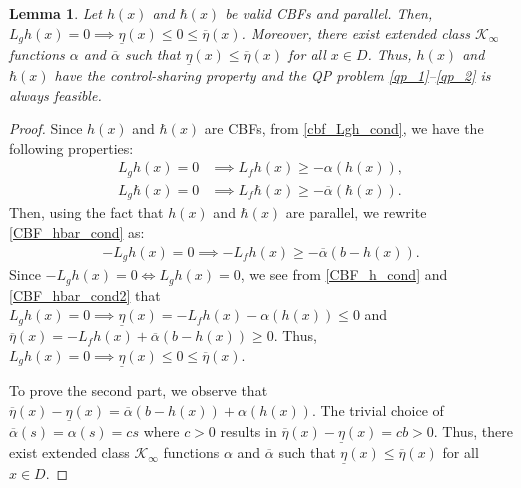 \documentclass[10pt,a4paper]{amsart}
\newtheorem{lemma}{Lemma}
\newcommand{\TODO}[1]{{\color{black}#1}}
\begin{document}
\begin{lemma}\label{lemma_feasible}
    Let $h(x)$ and $\hbar(x)$ be valid CBFs and parallel. Then, ${L_g h(x) = 0 \implies \underline{\eta}(x) \leq 0 \leq \overline{\eta}(x)}$. Moreover, there exist extended class $\mathcal{K}_{\infty}$ functions $\alpha$ and $\overline{\alpha}$ such that $\underline{\eta}(x) \leq \overline{\eta}(x)$ for all $x \in D$. Thus, $h(x)$ and $\hbar(x)$ have the control-sharing property and the QP problem \eqref{qp_1}--\eqref{qp_2} is always feasible.
\end{lemma}

\begin{proof}
    Since \TODO{$h(x)$ and $\hbar(x)$} 
    are CBFs, from \eqref{cbf_Lgh_cond}, we have the following properties:
    \begin{align}
            L_gh(x) = 0 &\implies L_fh(x) \geq -\alpha(h(x)),\label{CBF_h_cond}\\ 
            L_g\hbar(x) = 0 &\implies L_f\hbar(x) \geq -\overline{\alpha}(\hbar(x)).\label{CBF_hbar_cond}
    \end{align}
    Then, using the fact that $h(x)$ and $\hbar(x)$ are parallel, we rewrite \eqref{CBF_hbar_cond} as:
    \begin{align}
        -L_gh(x) = 0 \implies -L_fh(x) \geq -\overline{\alpha}(b - h(x))\label{CBF_hbar_cond2}.
    \end{align}
    Since ${-L_gh(x) = 0 \iff L_gh(x) = 0}$, we see from \eqref{CBF_h_cond} and \eqref{CBF_hbar_cond2} that $L_gh(x) = 0 \implies \underline{\eta}(x) = -L_fh(x) - \alpha(h(x)) \leq 0$ and $\overline{\eta}(x) = -L_fh(x) + \overline{\alpha}(b - h(x)) \geq 0$.
    Thus, $L_gh(x) = 0 \implies \underline{\eta}(x) \leq 0 \leq \overline{\eta}(x)$.
    
    To prove the second part, we observe that $ \overline{\eta}(x) - \underline{\eta}(x) = \overline{\alpha}(b-h(x)) + \alpha(h(x))$. The trivial choice of $\overline{\alpha}(s) = \alpha(s) = cs$ where $c > 0$ results in $\overline{\eta}(x) - \underline{\eta}(x) = cb > 0$. Thus, there exist extended class $\mathcal{K}_{\infty}$ functions $\alpha$ and $\overline{\alpha}$ such that $\underline{\eta}(x) \leq \overline{\eta}(x)$ for all $x \in D$.
\end{proof}
\end{document}

